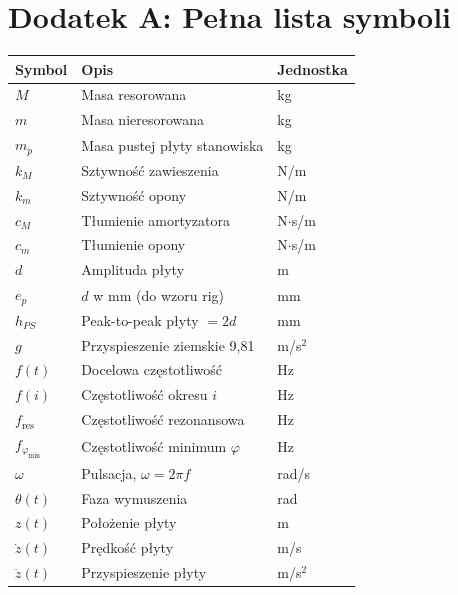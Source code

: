 \documentclass[11pt,a4paper]{article}
\theoremstyle{plainpol}
\begin{document}
\appendix
\clearpage

\section{Dodatek A: Pełna lista symboli}

\begin{longtable}{lll}
\toprule
\textbf{Symbol} & \textbf{Opis} & \textbf{Jednostka} \\
\midrule
\endhead
$M$        & Masa resorowana                    & kg \\
$m$        & Masa nieresorowana                 & kg \\
$m_p$      & Masa pustej płyty stanowiska       & kg \\
$k_M$      & Sztywność zawieszenia              & N/m \\
$k_m$      & Sztywność opony                    & N/m \\
$c_M$      & Tłumienie amortyzatora             & N$\cdot$s/m \\
$c_m$      & Tłumienie opony                    & N$\cdot$s/m \\
$d$        & Amplituda płyty                    & m \\
$e_p$      & $d$ w mm (do wzoru rig)            & mm \\
$h_{PS}$   & Peak-to-peak płyty $= 2d$          & mm \\
$g$        & Przyspieszenie ziemskie 9{,}81     & m/s$^2$ \\
$f(t)$     & Docelowa częstotliwość             & Hz \\
$f(i)$     & Częstotliwość okresu $i$           & Hz \\
$f_{\mathrm{res}}$ & Częstotliwość rezonansowa  & Hz \\
$f_{\varphi_{\min}}$ & Częstotliwość minimum $\varphi$ & Hz \\
$\omega$   & Pulsacja, $\omega = 2\pi f$        & rad/s \\
$\theta(t)$ & Faza wymuszenia                   & rad \\
$z(t)$     & Położenie płyty                    & m \\
$\dot{z}(t)$ & Prędkość płyty                   & m/s \\
$\ddot{z}(t)$ & Przyspieszenie płyty            & m/s$^2$ \\

\end{longtable}
\end{document}
